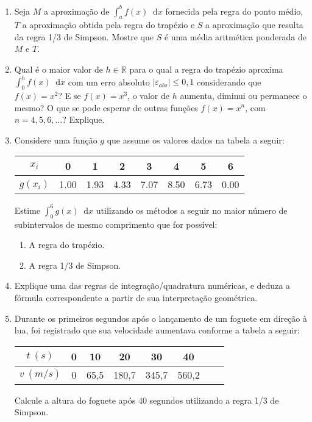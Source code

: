 \documentclass[12pt,a4paper]{article}
\newcommand*\diff{\mathop{}\!\mathrm{d}}
\begin{document}
\begin{enumerate}
\item Seja $M$ a aproximação de $\int_a^b f(x)\diff{x}$ fornecida pela regra do ponto médio, $T$ a aproximação obtida pela regra do trapézio e $S$ a aproximação que resulta da regra 1/3 de Simpson. Mostre que $S$ é uma média aritmética ponderada de $M$ e $T$.

\item Qual é o maior valor de $h \in \mathbb{R}$ para o qual a regra do trapézio aproxima $\int_0^h f(x) \diff{x}$ com um erro absoluto $|\varepsilon_{abs}| \leq 0,1$ considerando que $f(x) = x^2$? E se $f(x) = x^3$, o valor de $h$ aumenta, diminui ou permanece o mesmo? O que se pode esperar de outras funções $f(x) = x^n$, com $n = 4,5,6,\ldots$? Explique.

\item Considere uma função $g$ que assume os valores dados na tabela a seguir:
\begin{center}
\begin{tabular}{|c|c|c|c|c|c|c|c|}
\hline
   $x_i$ & 0 & 1 & 2 & 3 & 4 & 5 & 6 \\ \hline
$g(x_i)$ & 1.00 & 1.93 & 4.33 & 7.07 & 8.50 & 6.73 & 0.00 \\ \hline
\end{tabular}
\end{center}
Estime $\int_0^6 g(x)\diff{x}$ utilizando os métodos a seguir no maior número de subintervalos de mesmo comprimento que for possível:
\begin{multicols}{2}
\begin{enumerate}
\item A regra do trapézio.
\item A regra 1/3 de Simpson.
\end{enumerate}
\end{multicols}

\item Explique uma das regras de integração/quadratura numéricas, e deduza a fórmula correspondente a partir de sua interpretação geométrica.

\item Durante os primeiros segundos após o lançamento de um foguete em direção à lua, foi registrado que sua velocidade aumentava conforme a tabela a seguir:
\begin{center}
\begin{tabular}{|c|c|c|c|c|c|c|c|}
\hline
  $t\ (s)$ & 0 & 10 & 20 & 30 & 40 \\ \hline
$v\ (m/s)$ & 0 & 65,5 & 180,7 & 345,7 & 560,2 \\ \hline
\end{tabular}
\end{center}
Calcule a altura do foguete após 40 segundos utilizando a regra 1/3 de Simpson.


\end{enumerate}
\end{document}
